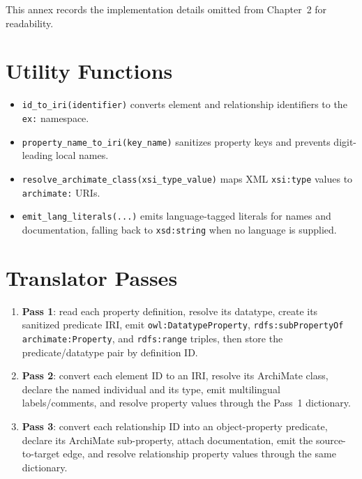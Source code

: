 This annex records the implementation details omitted from Chapter~2 for readability.
\section{Utility Functions}
\begin{itemize}
  \item \texttt{id\_to\_iri(identifier)} converts element and relationship identifiers to the \texttt{ex:} namespace.
  \item \texttt{property\_name\_to\_iri(key\_name)} sanitizes property keys and prevents digit-leading local names.
  \item \texttt{resolve\_archimate\_class(xsi\_type\_value)} maps XML \texttt{xsi:type} values to \texttt{archimate:} URIs.
  \item \texttt{emit\_lang\_literals(...)} emits language-tagged literals for names and documentation, falling back to \texttt{xsd:string} when no language is supplied.
\end{itemize}
\section{Translator Passes}
\begin{enumerate}
  \item \textbf{Pass 1}: read each property definition, resolve its datatype, create its sanitized predicate IRI, emit \texttt{owl:DatatypeProperty}, \texttt{rdfs:subPropertyOf archimate:Property}, and \texttt{rdfs:range} triples, then store the predicate/datatype pair by definition ID.
  \item \textbf{Pass 2}: convert each element ID to an IRI, resolve its ArchiMate class, declare the named individual and its type, emit multilingual labels/comments, and resolve property values through the Pass~1 dictionary.
  \item \textbf{Pass 3}: convert each relationship ID into an object-property predicate, declare its ArchiMate sub-property, attach documentation, emit the source-to-target edge, and resolve relationship property values through the same dictionary.
\end{enumerate}